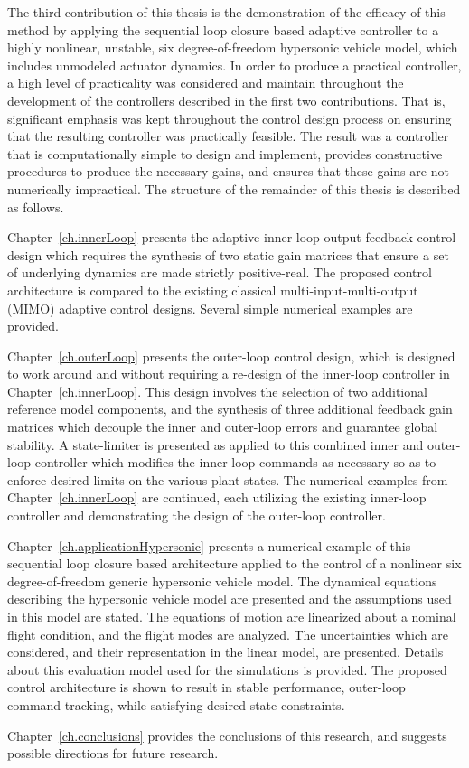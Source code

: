 The third contribution of this thesis is the demonstration of the efficacy of this method by applying the sequential loop closure based adaptive controller to a highly nonlinear, unstable, six degree-of-freedom hypersonic vehicle model, which includes unmodeled actuator dynamics.
In order to produce a practical controller, a high level of practicality was considered and maintain throughout the development of the controllers described in the first two contributions.
That is, significant emphasis was kept throughout the control design process on ensuring that the resulting controller was practically feasible.
The result was a controller that is computationally simple to design and implement, provides constructive procedures to produce the necessary gains, and ensures that these gains are not numerically impractical.
The structure of the remainder of this thesis is described as follows.

Chapter~\ref{ch.innerLoop} presents the adaptive inner-loop output-feedback control design which requires the synthesis of two static gain matrices that ensure a set of underlying dynamics are made strictly positive-real.
The proposed control architecture is compared to the existing classical multi-input-multi-output (MIMO) adaptive control designs.
Several simple numerical examples are provided.

Chapter~\ref{ch.outerLoop} presents the outer-loop control design, which is designed to work around and without requiring a re-design of the inner-loop controller in Chapter~\ref{ch.innerLoop}.
This design involves the selection of two additional reference model components, and the synthesis of three additional feedback gain matrices which decouple the inner and outer-loop errors and guarantee global stability.
A state-limiter is presented as applied to this combined inner and outer-loop controller which modifies the inner-loop commands as necessary so as to enforce desired limits on the various plant states.
The numerical examples from Chapter~\ref{ch.innerLoop} are continued, each utilizing the existing inner-loop controller and demonstrating the design of the outer-loop controller.

Chapter~\ref{ch.applicationHypersonic} presents a numerical example of this sequential loop closure based architecture applied to the control of a nonlinear six degree-of-freedom generic hypersonic vehicle model.
The dynamical equations describing the hypersonic vehicle model are presented and the assumptions used in this model are stated.
The equations of motion are linearized about a nominal flight condition, and the flight modes are analyzed.
The uncertainties which are considered, and their representation in the linear model, are presented.
Details about this evaluation model used for the simulations is provided.
The proposed control architecture is shown to result in stable performance, outer-loop command tracking, while satisfying desired state constraints.

Chapter~\ref{ch.conclusions} provides the conclusions of this research, and suggests possible directions for future research.
